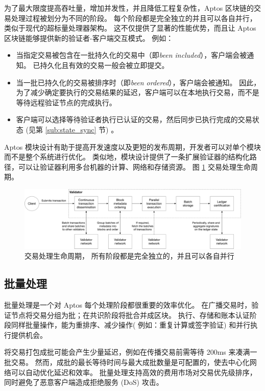 \documentclass{article}
\begin{document}
为了最大限度提高吞吐量，增加并发性，并且降低工程复杂性，Aptos 区块链的交易处理过程被划分为不同的阶段。 每个阶段都是完全独立的并且可以各自并行，类似于现代的超标量处理器架构。 这不仅提供了显著的性能优势，而且让 Aptos 区块链能够提供新的验证者-客户端交互模式。 例如：

\begin{itemize}
\item 当指定交易被包含在一批持久化的交易中（即\emph{been included}），客户端会被通知。 已持久化且有效的交易一般会被立即提交。 

\item 当一批已持久化的交易被排序时（即\emph{been ordered}），客户端会被通知。 因此，为了减少确定要执行的交易结果的延迟，客户端可以在本地执行交易，而不是等待远程验证节点的完成执行。

\item 客户端可以选择等待验证者执行已认证的交易，然后同步已执行完成的交易状态 (见第 \ref{sub:state_sync} 节) 。

\end{itemize}

Aptos 模块设计有助于提高开发速度以及更短的发布周期，开发者可以对单个模块而不是整个系统进行优化。 类似地，模块设计提供了一条扩展验证器的结构化路径，可以让验证器利用多台机器的计算、网络和存储资源。 图 \ref{fig:pipeline} 交易处理生命周期。


\begin{figure}
\centering
\includegraphics[width=1.0\textwidth]{pipeline.pdf}
\caption{\label{fig:pipeline}交易处理生命周期， 所有阶段都是完全独立的，并且可以各自并行}
\end{figure}

\subsection{批量处理}

批量处理是一个对 Aptos 每个处理阶段都很重要的效率优化。 在广播交易时，验证节点将交易分组为批；在共识阶段将批合并成区块。 执行、存储和账本认证阶段同样批量操作，能为重排序、减少操作( 例如：重复计算或签字验证) 和并行执行提供机会。

将交易打包成批可能会产生少量延迟，例如在传播交易前需等待 200ms 来凑满一批交易。 然而，成批的最长等待时间与最大成批数量是可配置的，使去中心化网络可以自动优化延迟和效率。 批量处理支持高效的费用市场对交易优先级排序，同时避免了恶意客户端造成拒绝服务 (DoS) 攻击。
\end{document}
